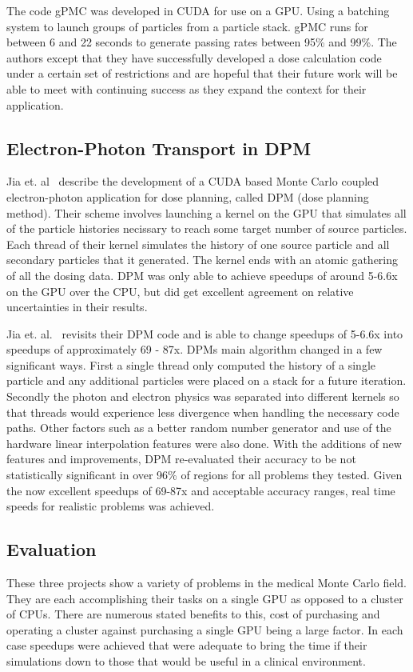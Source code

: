 %
The code gPMC was developed in CUDA for use on a GPU.
%
Using a batching system to launch groups of particles from a particle stack.
%
gPMC runs for between 6 and 22 seconds to generate passing rates between 95\% and 99\%.
%
The authors except that they have successfully developed a dose calculation code under a certain set of restrictions and are hopeful that their future work will be able to meet with continuing success as they expand the context for their application.~\cite{jia2012gpu}

\subsection*{Electron-Photon Transport in DPM }

Jia et. al~\cite{jia2010development} describe the development of a CUDA based Monte Carlo coupled electron-photon application for dose planning, called DPM (dose planning method).
%
 Their scheme involves launching a kernel on the GPU that simulates all of the particle histories necissary to reach some target number of source particles.
 Each thread of their kernel simulates the history of one source particle and all secondary particles that it generated.
 The kernel ends with an atomic gathering of all the dosing data.
 DPM was only able to achieve speedups of around 5-6.6x on the GPU over the CPU, but did get excellent agreement on relative uncertainties in their results.~\cite{jia2010development}
 
 Jia et. al.~\cite{jia2011gpu} revisits their DPM code and is able to change speedups of 5-6.6x into speedups of approximately 69 - 87x.
%
DPMs main algorithm changed in a few significant ways.
%
First a single thread only computed the history of a single particle and any additional particles were placed on a stack for a future iteration.
%
Secondly the photon and electron physics was separated into different kernels so that threads would experience less divergence when handling the necessary code paths.
%
Other factors such as a better random number generator and use of the hardware linear interpolation features were also done.
%
With the additions of new features and improvements, DPM re-evaluated their accuracy to be not statistically significant in over 96\% of regions for all problems they tested.
%
Given the now excellent speedups of 69-87x and acceptable accuracy ranges, real time speeds for realistic problems was achieved.
~\cite{jia2011gpu}


\subsection*{Evaluation}

These three projects show a variety of problems in the medical Monte Carlo field.
%
They are each accomplishing their tasks on a single GPU as opposed to a cluster of CPUs.
%
There are numerous stated benefits to this, cost of purchasing and operating a cluster against purchasing a single GPU being a large factor.
%
In each case speedups were achieved that were adequate to bring the time if their simulations down to those that would be useful in a clinical environment.
%

